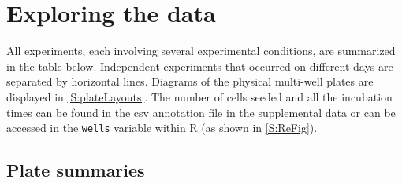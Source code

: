 \section{ Exploring the data }

All experiments, each involving several experimental conditions, are summarized
in the table below. Independent experiments that occurred on different days are
separated by horizontal lines.
Diagrams of the physical multi-well plates are displayed in \ref{S:plateLayouts}.
The number of cells seeded and all the incubation times can be found in the
csv annotation file in the supplemental data or can be accessed in the \texttt{wells} variable
within R (as shown in \ref{S:ReFig}).

\subsection{Plate summaries}

